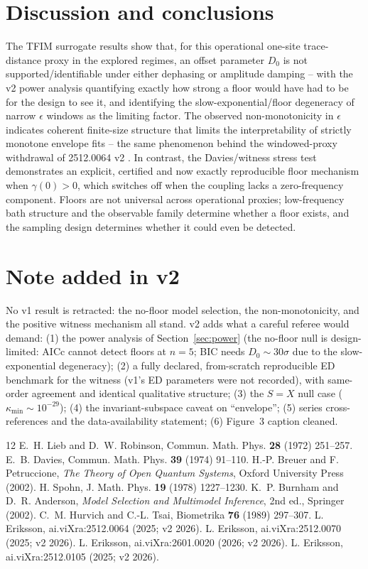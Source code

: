 \documentclass[11pt]{article}
\begin{document}
\section{Discussion and conclusions}
The TFIM surrogate results show that, for this operational one-site
trace-distance proxy in the explored regimes, an offset parameter $D_0$
is not supported/identifiable under either dephasing or amplitude
damping -- with the v2 power analysis quantifying exactly how strong a
floor would have had to be for the design to see it, and identifying the
slow-exponential/floor degeneracy of narrow $\epsilon$ windows as the
limiting factor. The observed non-monotonicity in $\epsilon$ indicates
coherent finite-size structure that limits the interpretability of
strictly monotone envelope fits -- the same phenomenon behind the
windowed-proxy withdrawal of 2512.0064 v2 \cite{S0064}. In contrast, the
Davies/witness stress test demonstrates an explicit, certified and now
exactly reproducible floor mechanism when $\gamma(0) > 0$, which switches
off when the coupling lacks a zero-frequency component. Floors are not
universal across operational proxies; low-frequency bath structure and
the observable family determine whether a floor exists, and the sampling
design determines whether it could even be detected.

\section*{Note added in v2}
No v1 result is retracted: the no-floor model selection, the
non-monotonicity, and the positive witness mechanism all stand. v2 adds
what a careful referee would demand: (1) the power analysis of
Section~\ref{sec:power} (the no-floor null is design-limited: AICc
cannot detect floors at $n = 5$; BIC needs $D_0 \sim 30\sigma$ due to the
slow-exponential degeneracy); (2) a fully declared, from-scratch
reproducible ED benchmark for the witness (v1's ED parameters were not
recorded), with same-order agreement and identical qualitative structure;
(3) the $S = X$ null case ($\kappa_{\min} \sim 10^{-29}$); (4) the
invariant-subspace caveat on ``envelope''; (5) series cross-references
and the data-availability statement; (6) Figure~3 caption cleaned.

\begin{thebibliography}{12}
 E.~H. Lieb and D.~W. Robinson, Commun. Math. Phys.
\textbf{28} (1972) 251--257.
 E.~B. Davies, Commun. Math. Phys. \textbf{39} (1974)
91--110.
 H.-P. Breuer and F. Petruccione, \emph{The Theory of Open
Quantum Systems}, Oxford University Press (2002).
 H. Spohn, J. Math. Phys. \textbf{19} (1978) 1227--1230.
 K.~P. Burnham and D.~R. Anderson, \emph{Model Selection and
Multimodel Inference}, 2nd ed., Springer (2002).
 C.~M. Hurvich and C.-L. Tsai, Biometrika \textbf{76} (1989)
297--307.
 L. Eriksson, ai.viXra:2512.0064 (2025; v2 2026).
 L. Eriksson, ai.viXra:2512.0070 (2025; v2 2026).
 L. Eriksson, ai.viXra:2601.0020 (2026; v2 2026).
 L. Eriksson, ai.viXra:2512.0105 (2025; v2 2026).
\end{thebibliography}
\end{document}
